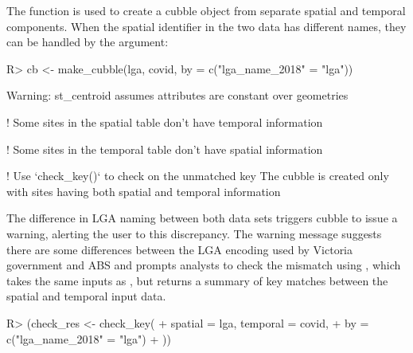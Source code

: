 \documentclass[
  shortnames]{jss}
\begin{document}
The function  is used to create a cubble object from separate spatial and temporal components. When the spatial identifier in the two data has different names, they can be handled by the  argument:

\begin{CodeChunk}
\begin{CodeInput}
R> cb <- make_cubble(lga, covid, by = c("lga_name_2018" = "lga"))
\end{CodeInput}
\begin{CodeOutput}
Warning: st_centroid assumes attributes are constant over geometries
\end{CodeOutput}
\begin{CodeOutput}
! Some sites in the spatial table don't have temporal information
\end{CodeOutput}
\begin{CodeOutput}
! Some sites in the temporal table don't have spatial information
\end{CodeOutput}
\begin{CodeOutput}
! Use `check_key()` to check on the unmatched key
The cubble is created only with sites having both spatial and
temporal information
\end{CodeOutput}
\end{CodeChunk}

The difference in LGA naming between both data sets triggers cubble to issue a warning, alerting the user to this discrepancy. The warning message suggests there are some differences between the LGA encoding used by Victoria government and ABS and prompts analysts to check the mismatch using , which takes the same inputs as , but returns a summary of key matches between the spatial and temporal input data.

\begin{CodeChunk}
\begin{CodeInput}
R> (check_res <- check_key(
+   spatial = lga, temporal = covid, 
+   by = c("lga_name_2018" = "lga")
+ ))
\end{CodeInput}
\end{CodeChunk}
\end{document}
